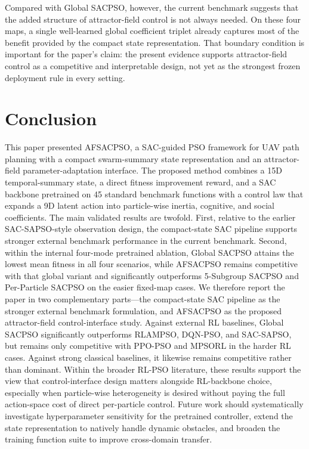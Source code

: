 \documentclass[final,5p,times]{elsarticle}
\begin{document}
Compared with Global SACPSO, however, the current benchmark suggests that the added structure of attractor-field control is not always needed. On these four maps, a single well-learned global coefficient triplet already captures most of the benefit provided by the compact state representation. That boundary condition is important for the paper's claim: the present evidence supports attractor-field control as a competitive and interpretable design, not yet as the strongest frozen deployment rule in every setting.

\section{Conclusion}
\label{sec:conclusion}
This paper presented AFSACPSO, a SAC-guided PSO framework for UAV path planning with a compact swarm-summary state representation and an attractor-field parameter-adaptation interface.
The proposed method combines a 15D temporal-summary state, a direct fitness improvement reward, and a SAC backbone pretrained on 45 standard benchmark functions with a control law that expands a 9D latent action into particle-wise inertia, cognitive, and social coefficients.
The main validated results are twofold. First, relative to the earlier SAC-SAPSO-style observation design, the compact-state SAC pipeline supports stronger external benchmark performance in the current benchmark. Second, within the internal four-mode pretrained ablation, Global SACPSO attains the lowest mean fitness in all four scenarios, while AFSACPSO remains competitive with that global variant and significantly outperforms 5-Subgroup SACPSO and Per-Particle SACPSO on the easier fixed-map cases.
We therefore report the paper in two complementary parts---the compact-state SAC pipeline as the stronger external benchmark formulation, and AFSACPSO as the proposed attractor-field control-interface study.
Against external RL baselines, Global SACPSO significantly outperforms RLAMPSO, DQN-PSO, and SAC-SAPSO, but remains only competitive with PPO-PSO and MPSORL in the harder RL cases. Against strong classical baselines, it likewise remains competitive rather than dominant.
Within the broader RL-PSO literature, these results support the view that control-interface design matters alongside RL-backbone choice, especially when particle-wise heterogeneity is desired without paying the full action-space cost of direct per-particle control.
Future work should systematically investigate hyperparameter sensitivity for the pretrained controller, extend the state representation to natively handle dynamic obstacles, and broaden the training function suite to improve cross-domain transfer.
\end{document}
